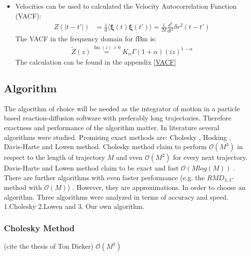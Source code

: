 \documentclass[
  a4paper,BCOR10mm,oneside,
  bibtotoc,idxtotoc,
  headsepline,footsepline,%
  fleqn,openbib
]{scrbook}
\begin{document}
\begin{itemize} 
\item Velocities can be used to calculated the Velocity Autocorrelation Function (VACF):
\begin{align}
Z(|t-t'|)&= \frac{1}{d}\langle \bm{\xi}(t) \bm{\xi}(t') \rangle = \frac{1}{2d} \frac{d^2}{dt^2} \delta r^2 (t-t')  
\end{align}
The VACF in the frequency domain for fBm is: 
\begin{align}
  \tilde{Z}(z) \stackrel{\operatorname{Im}(z)> 0} {=}  K_{\alpha} \Gamma(1+\alpha)(i z)^{1-\alpha}
\end{align}
The calculation can be found in the appendix \ref{VACF}
\end{itemize}
\subsection{Algorithm}
The algorithm of choice will be needed as the integrator of motion in a particle based reaction-diffusion software with preferably long trajectories. Therefore exactness and performance of the algorithm matter. In literature several algorithms were studied. Promising exact methods are: Cholesky \cite{Dieker2004}, Hosking \cite{WRCR:WRCR3676}, Davis-Harte \cite{Dieker2004} and  Lowen \cite{Lowen1999} method. Cholesky  method claim to perform $\mathcal{O}(M^3)$ in respect to the length of trajectory $M$ and even $\mathcal{O}(M^2)$ for every next trajectory. Davis-Harte and Lowen method claim to be exact and fast $\mathcal{O}(M log(M))$ \cite{DAVIES1987}\cite{Lowen1999}. There are further algorithms with even faster performance (e.g. the $RMD_{3,3}$- method \cite{Dieker2004} with $\mathcal{O}(M)$) . However, they are approximations. In order to choose an algorithm. Three algorithms were analyzed in terms of accuracy and speed. 1.Cholesky  2.Lowen and 3. Our own algorithm.
\subsubsection{Cholesky Method}
(cite the thesis of Ton Dieker)
$\mathcal{O}(M^3)$
\end{document}
